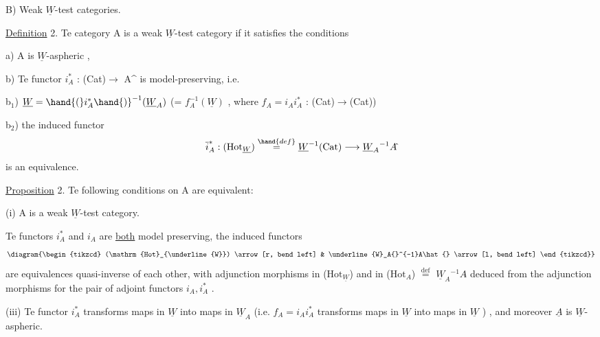 
B)  Weak $\underline{W}$-test categories.

\uline{Definition} 2.  Te category A is a weak $\underline{W}$-test category  if it satisfies
the conditions

a)  A is $\underline{W}$-aspheric ,

b)  Te functor  $i_A^*$ : (Cat)$\longrightarrow$ A\^{} is model-preserving,  i.e.

b$_1$)  $\underline{W} = \hand{(}i_A^*\hand{)}^{-1}(\underline{W}_A)$  (= $f_A^{-1}(\underline{W})$ ,  where $f_A{=}i_Ai_A^*$ : (Cat)$\to$(Cat))\hand{,}

b$_2$)  the induced functor
\[ \overline{i}_A^* : (\mathrm{Hot}_{\underline{W}}) \overset{\hand{def}}{=} \underline{W}^{-1}(\mathrm{Cat}) \longrightarrow \underline{W}_A{}^{-1}A\hat{} \]
is an equivalence.

\uline{Proposition} 2.  Te following conditions on A are equivalent:

(i)  A is a weak $\underline{W}$-test category.

  Te functors  $i_A^*$ and $i_A$ are \uline{both} model preserving,  the induced
functors
\[ \diagram{\begin{tikzcd} (\mathrm{Hot}_{\underline{W}}) \arrow[r, bend left] & \underline{W}_A{}^{-1}A\hat{} \arrow[l, bend left] \end{tikzcd}} \]
are equivalences quasi-inverse of each other,  with adjunction morphisms
in (\uline{$\mathrm{Hot}_{\underline{W}}$})  and in ($\mathrm{Hot}_A$) $\overset{\mathrm{def}}{=}$  $\underline{W}_A{}^{-1}A\hat{}$ deduced from the adjunction morphisms
for the pair of adjoint functors $i_A,i_A^*$ .

(iii)  Te functor  $i_A^*$  transforms maps in $\underline{W}$  into maps in $\underline{W}_A$  (i.e.
$f_A = i_Ai_A^*$  transforms maps in $\underline{W}$ into maps in $\underline{W}$ ) ,  and moreover $\underline{A}$  is
 $\underline{W}$-aspheric.

